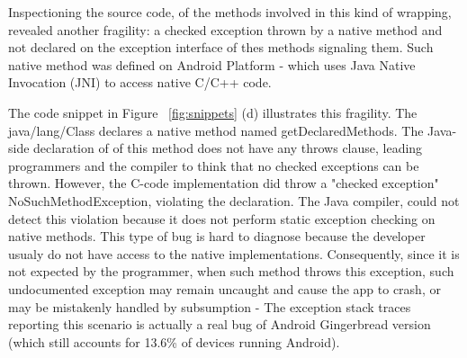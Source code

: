 \documentclass[conference]{IEEEtran}
\begin{document}




Inspectioning the source code, of the methods involved in this kind of wrapping,
revealed another fragility: a checked exception thrown by a native method and not
declared on the exception interface of thes methods signaling them. Such native method 
was defined on Android Platform -  which uses Java Native Invocation (JNI) to access 
native C/C++ code. 

The code snippet in Figure ~\ref{fig:snippets} (d) illustrates this fragility.
 The java/lang/Class declares a native method named getDeclaredMethods. 
The Java-side declaration of of this method does not have any throws clause, 
leading programmers and the compiler to think that no checked exceptions can be thrown.
 However, the C-code implementation did throw a "checked exception" NoSuchMethodException, 
violating the declaration. The Java compiler, could not detect this violation because it does 
not perform static exception checking on native methods. This type of bug is hard to diagnose
because the developer usualy do not have access to the native implementations. 
Consequently, since it is not expected by the programmer, when such method throws 
this exception, such undocumented exception may remain
uncaught and cause the app to crash, or may be mistakenly handled by subsumption - 
The exception stack traces reporting this scenario is actually a real bug of Android 
Gingerbread version (which still accounts for 13.6\% of devices running Android).
\end{document}
